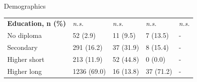 \documentclass[handout,10pt]{beamer}
\begin{document}
\begin{frame}{Demographics}
\begin{table}[!htbp]
{\begin{tabular}{p{4cm}llll}
\textbf{Education, n (\%)} & \textit{n.s.} & \textit{n.s.} & \textit{n.s.} & \textit{n.s.} \\
No diploma   & 52   (2.9)  & 11  (9.5)  & 7  (13.5)  & -  \\
Secondary    & 291  (16.2) & 37  (31.9) & 8  (15.4)  & - \\
Higher short & 213  (11.9) & 52  (44.8) & 0  (0.0)   & - \\
Higher long  & 1236 (69.0) & 16  (13.8) & 37 (71.2)  & - \\
\end{tabular}}
\label{tab:demographics}
\end{table}

\end{frame}
\end{document}
